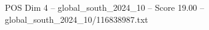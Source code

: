 \begin{textsample}{POS Dim 4 – global\_south\_2024\_10 – Score 19.00 – global\_south\_2024\_10/116838987.txt}
\end{textsample}
